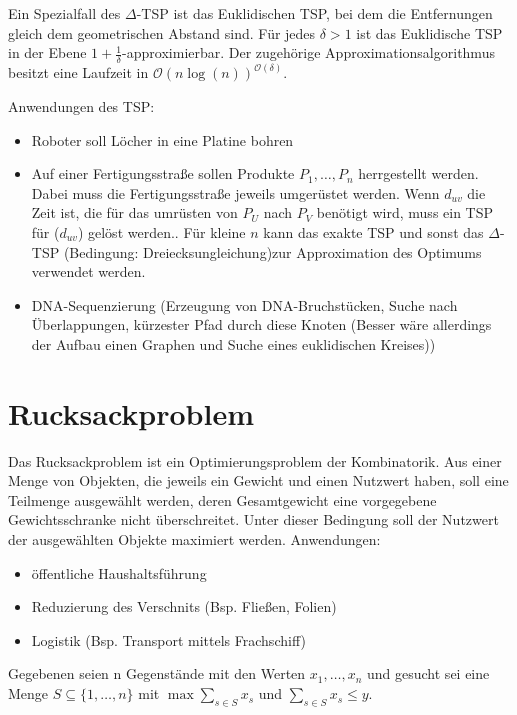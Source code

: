 Ein Spezialfall des \(\Delta\)-TSP ist das Euklidischen TSP, bei dem die Entfernungen gleich dem geometrischen Abstand sind. Für jedes \(\delta > 1\) ist das Euklidische TSP in der Ebene \(1+\frac{1}{\delta}\)-approximierbar.
Der zugehörige Approximationsalgorithmus besitzt eine Laufzeit in \(\mathcal{O}(n \log(n))^{\mathcal{O}(\delta)}\).

Anwendungen des TSP:
\begin{itemize}
	\item Roboter soll Löcher in eine Platine bohren
	\item Auf einer Fertigungsstraße sollen Produkte \(P_{1}, \ldots, P_{n}\) herrgestellt werden.
		Dabei muss die Fertigungsstraße jeweils umgerüstet werden.
		Wenn \(d_{uv}\) die Zeit ist, die für das umrüsten von \(P_{U}\) nach \(P_{V}\) benötigt wird, muss ein TSP für (\(d_{uv}\)) gelöst werden..
		Für kleine \(n\) kann das exakte TSP und sonst das \(\Delta\)-TSP (Bedingung: Dreiecksungleichung)zur Approximation des Optimums verwendet werden.
	\item DNA-Sequenzierung (Erzeugung von DNA-Bruchstücken, Suche nach Über\-lap\-pungen, kürzester Pfad durch diese Knoten (Besser wäre allerdings der Aufbau einen Graphen und Suche eines euklidischen Kreises))
\end{itemize}



\section{Rucksackproblem}
Das Rucksackproblem ist ein Optimierungsproblem der Kombinatorik.
Aus einer Menge von Objekten, die jeweils ein Gewicht und einen Nutzwert haben, soll eine Teilmenge ausgewählt werden, deren Gesamtgewicht eine vorgegebene Gewichtsschranke nicht überschreitet.
Unter dieser Bedingung soll der Nutzwert der ausgewählten Objekte maximiert werden.
Anwendungen:
\begin{itemize}
	\item öffentliche Haushaltsführung
	\item Reduzierung des Verschnits (Bsp. Fließen, Folien)
	\item Logistik (Bsp. Transport mittels Frachschiff)
\end{itemize}

Gegebenen seien n Gegenstände mit den Werten \(x_{1}, \dots, x_{n}\) und gesucht sei eine Menge \(S \subseteq \{1, \dots, n\}\) mit
\(\max \sum\limits_{s \in S}x_{s}\) und \( \sum\limits_{s \in S}x_{s} \leq y \).

